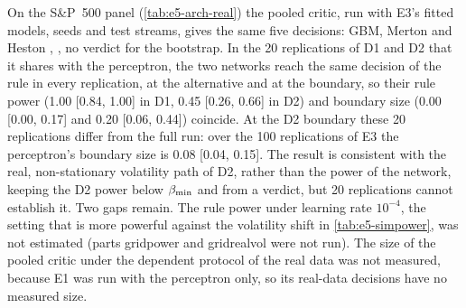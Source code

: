 On the S\&P~500 panel (\cref{tab:e5-arch-real}) the pooled critic, run with E3's fitted models,
seeds and test streams, gives the same five decisions: GBM, Merton and Heston \BAD{}, \GARCHt{}
\INCONCL{}, no verdict for the bootstrap. In the 20 replications of D1 and D2 that it shares with
the perceptron, the two networks reach the same decision of the rule in every replication, at the
alternative and at the boundary, so their rule power (1.00 [0.84, 1.00] in D1, 0.45 [0.26, 0.66]
in D2) and boundary size (0.00 [0.00, 0.17] and 0.20 [0.06, 0.44]) coincide. At the D2 boundary these
20 replications differ from the full run: over the 100 replications of E3 the perceptron's
boundary size is 0.08 [0.04, 0.15]. The result is consistent with the real,
non-stationary \TRAIN{} volatility path of D2, rather than the power of the network, keeping the
D2 power below $\beta_{\min}$ and \GARCHt{} from a \GOOD{} verdict, but 20 replications cannot establish
it. Two gaps remain. The rule power under learning rate $10^{-4}$, the setting that is more
powerful against the volatility shift in \cref{tab:e5-simpower}, was not estimated (parts gridpower and gridrealvol were not
run). The size of the pooled critic under the dependent protocol of the real data was not
measured, because E1 was run with the perceptron only, so its real-data decisions have no
measured size.

\begin{table}[tbp]
  \centering
  \caption{Critic architecture ablation on simulated data: default multilayer perceptron (MLP)
    against the time-pooled CNN critic (post hoc; architecture selected after a pilot on four E2
    designs at $n=500$), paired replications of E2 (independent windows, $n=500$, $L=20$) and
    E2-dep ($n=2000$), $\alpha=0.05$.}
  \label{tab:e5-arch}
  \small\setlength{\tabcolsep}{3pt}
\end{table}

